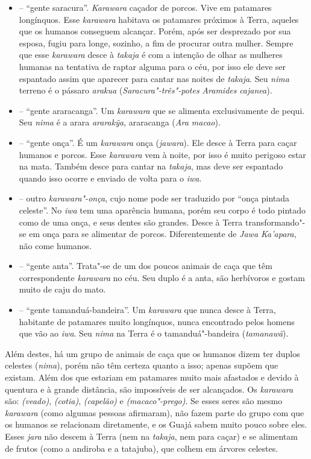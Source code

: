 \begin{itemize}
\item
  \emph{} -- ``gente saracura''. \emph{Karawara} caçador de porcos. Vive
  em patamares longínquos. Esse \emph{karawara} habitava os patamares
  próximos à Terra, aqueles que os humanos conseguem alcançar. Porém,
  após ser desprezado por sua esposa, fugiu para longe, sozinho, a fim
  de procurar outra mulher. Sempre que esse \emph{karawara} desce à
  \emph{takaja} é com a intenção de olhar as mulheres humanas na
  tentativa de raptar alguma para o céu, por isso ele deve ser espantado
  assim que aparecer para cantar nas noites de \emph{takaja}. Seu
  \emph{nima} terreno é o pássaro \emph{arakua}
  (\emph{Saracura"-três"-potes} \emph{Aramides} \emph{cajanea}).
\item
   -- ``gente araracanga''. Um \emph{karawara} que se
  alimenta exclusivamente de pequi. Seu \emph{nima} é a arara
  \emph{ararakỹa}, araracanga (\emph{Ara macao}).
\item
  \emph{} -- ``gente onça''. É um \emph{karawara} onça
  (\emph{jawara}). Ele desce à Terra para caçar humanos e porcos. Esse
  \emph{karawara} vem à noite, por isso é muito perigoso estar na mata.
  Também desce para cantar na \emph{takaja}, mas deve ser espantado
  quando isso ocorre e enviado de volta para o \emph{iwa}.
\item
  \emph{} -- outro \emph{karawara"-onça}, cujo nome
  pode ser traduzido por ``onça pintada celeste''. No \emph{iwa} tem uma
  aparência humana, porém seu corpo é todo pintado como de uma onça, e
  seus dentes são grandes. Desce à Terra transformando"-se em onça para
  se alimentar de porcos. Diferentemente de \emph{Jawa
  Ka'apara}, não come humanos.
\item
  \emph{} -- ``gente anta''. Trata"-se de um dos
  poucos animais de caça que têm correspondente \emph{karawara} no céu.
  Seu duplo é a anta, são herbívoros e gostam muito de caju do mato.
\item
  \emph{} -- ``gente tamanduá-bandeira''. Um \emph{karawara} que nunca desce à
  Terra, habitante de patamares muito longínquos, nunca encontrado pelos
  homens que vão ao \emph{iwa}. Seu \emph{nima} na Terra é o
  tamanduá"-bandeira (\emph{tamanawã}).
\end{itemize}

Além destes, há um grupo de animais de caça que os humanos dizem ter
duplos celestes (\emph{nima}), porém não têm certeza quanto a isso;
apenas supõem que existam. Além dos que estariam em patamares muito mais
afastados e devido à quentura e à grande distância, são impossíveis de
ser alcançados. Os \emph{karawara} são: \emph{
(veado)}, \emph{ (cotia)}, \emph{
(capelão)} e \emph{ (macaco"-prego)}. Se esses seres
são mesmo \emph{karawara} (como algumas pessoas afirmaram), não fazem
parte do grupo com que os humanos se relacionam diretamente, e os Guajá
sabem muito pouco sobre eles. Esses \emph{jara} não descem à Terra (nem
na \emph{takaja}, nem para caçar) e se alimentam de frutos (como a
andiroba e a tatajuba), que colhem em árvores celestes.

